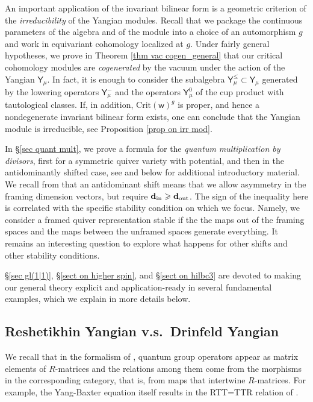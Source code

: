 \documentclass[10pt]{amsart}
\theoremstyle{definition}
\numberwithin{equation}{section}
\newcommand{\Crit}{\mathrm{Crit}}
\newcommand{\sw}{\mathsf{w}}
\begin{document}
An important application of the invariant bilinear form is a geometric
criterion of the \textit{irreducibility} of the Yangian modules. Recall that
we package the continuous parameters of the algebra and of the module
into a choice of an automorphism $g$ and work in equivariant cohomology
localized at $g$. Under fairly
general hypotheses, we prove in Theorem \ref{thm vac cogen_general} that our critical
cohomology modules are \emph{cogenerated} by the vacuum under
the action of the Yangian $\mathsf Y_\mu$. In fact, it is enough to consider the subalgebra
$\mathsf Y_\mu^{\leqslant} \subset \mathsf Y_\mu$ generated by 
the lowering
operators $\mathsf Y_\mu^-$ and the operators $\mathsf Y_\mu^0$ of the
cup product with tautological classes. If, in addition, $\Crit(\sw)^g$ is
proper, and hence a nondegenerate invariant bilinear form exists,
one can conclude that the Yangian module is irreducible, see Proposition 
\ref{prop on irr mod}. 

In \S \ref{sec quant mult}, we prove a formula for the \textit{quantum
multiplication by divisors}, first for a symmetric
quiver variety with potential, and then in the antidominantly
shifted case, see \cite[\S 1.11]{COZZ} and
below for additional introductory material.
We recall from \cite{COZZ} that an antidominant shift means that 
we allow asymmetry in the framing dimension vectors,
but require $\mathbf{d}_\textup{in} \geqslant \mathbf{d}_\textup{out}$.
The sign of the inequality here is correlated with the
specific stability condition on which we focus. Namely,
we consider a framed quiver representation stable if the
the maps out of the framing spaces and the maps between
the unframed spaces generate everything. It remains
an interesting question to explore what happens for
other shifts and other stability conditions. 

\S \ref{sec gl(1|1)}, \S \ref{sect on higher spin}, and \S \ref{sect on hilbc3} are devoted to making our general
theory explicit and application-ready in several
fundamental examples, which we explain in more details below. 


\subsection{Reshetikhin Yangian v.s.\ Drinfeld Yangian}

We recall that in the formalism of \cite{Resh90}, quantum group
operators appear as matrix elements of $R$-matrices and
the relations among them come from the morphisms in the
corresponding category, that is, from maps that intertwine
$R$-matrices. For example, the Yang-Baxter equation itself
results in the RTT=TTR relation of \cite{FRT}.
\end{document}
